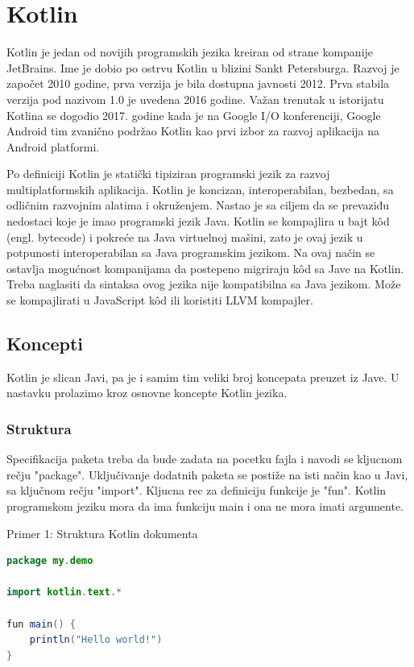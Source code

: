 \documentclass[12pt,oneside]{memoir}
\begin{document}
\section{Kotlin}
Kotlin je jedan od novijih programskih jezika kreiran od strane kompanije JetBrains. Ime je dobio po ostrvu Kotlin u blizini Sankt Petersburga. Razvoj je započet 2010 godine, prva verzija je bila dostupna javnosti 2012. Prva stabila verzija pod nazivom 1.0 je uvedena 2016 godine. Važan trenutak u istorijatu Kotlina se dogodio 2017. godine kada je na Google I/O konferenciji, Google Android tim zvanično podržao Kotlin kao prvi izbor za razvoj aplikacija na Android platformi. 
 
 
Po definiciji Kotlin je statički tipiziran programski jezik za razvoj multiplatformskih aplikacija. Kotlin je koncizan, interoperabilan, bezbedan, sa odličnim razvojnim alatima i okruženjem. Nastao je sa ciljem da se prevaziđu nedostaci koje je imao programski jezik Java. Kotlin se kompajlira u bajt kôd (engl. bytecode) i pokreće na Java virtuelnoj mašini, zato je ovaj jezik u potpunosti interoperabilan sa Java programskim jezikom. Na ovaj način se ostavlja mogućnost kompanijama da postepeno migriraju kôd sa Jave na Kotlin. Treba naglasiti da sintaksa ovog jezika nije kompatibilna sa Java jezikom. Može se kompajlirati u JavaScript kôd ili koristiti LLVM kompajler.

 
\subsection{Koncepti}
Kotlin je slican Javi, pa je i samim tim veliki broj koncepata preuzet iz Jave. U nastavku prolazimo kroz osnovne koncepte Kotlin jezika. 
\subsubsection{Struktura}
Specifikacija paketa treba da bude zadata na pocetku fajla i navodi se kljucnom rečju "package". Uključivanje dodatnih paketa se postiže na isti način kao u Javi, sa ključnom rečju "import". Kljucna rec za definiciju funkcije je "fun". Kotlin programskom jeziku mora da ima funkciju main i ona ne mora imati argumente. 
 
\begin{center} Primer 1: Struktura Kotlin dokumenta\end{center}
\begin{lstlisting}[language=Java]
package my.demo
 
import kotlin.text.*
 
fun main() {
    println("Hello world!")
}
\end{lstlisting}
 
\end{document}
